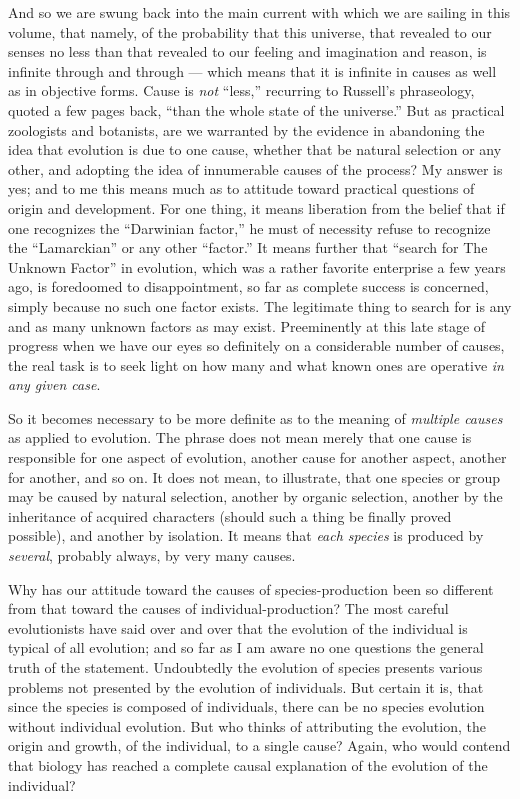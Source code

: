 \documentclass[a4paper, 11pt, oneside, polutonikogreek, english]{article}
\begin{document}
And so we are swung back into the main current with which we are sailing in this volume, that namely, of the probability that this universe, that revealed to our senses no less than that revealed to our feeling and imagination and reason, is infinite through and through --- which means that it is infinite in causes as well as in objective forms. Cause is \emph{not} ``less,'' recurring to Russell's phraseology, quoted a few pages back, ``than the whole state of the universe.'' But as practical zoologists and botanists, are we warranted by the evidence in abandoning the idea that evolution is due to one cause, whether that be natural selection or any other, and adopting the idea of innumerable causes of the process? My answer is yes; and to me this means much as to attitude toward practical questions of origin and development. For one thing, it means liberation from the belief that if one recognizes the ``Darwinian factor,'' he must of necessity refuse to recognize the ``Lamarckian'' or any other ``factor.'' It means further that ``search for The Unknown Factor'' in evolution, which was a rather favorite enterprise a few years ago, is foredoomed to disappointment, so far as complete success is concerned, simply because no such one factor exists. The legitimate thing to search for is any and as many unknown factors as may exist. Preeminently at this late stage of progress when we have our eyes so definitely on a considerable number of causes, the real task is to seek light on how many and what known ones are operative \emph{in any given case}.

So it becomes necessary to be more definite as to the meaning of \emph{multiple causes} as applied to evolution. The phrase does not mean merely that one cause is responsible for one aspect of evolution, another cause for another aspect, another for another, and so on. It does not mean, to illustrate, that one species or group may be caused by natural selection, another by organic selection, another by the inheritance of acquired characters (should such a thing be finally proved possible), and another by isolation. It means that \emph{each species} is produced by \emph{several}, probably always, by very many causes.

Why has our attitude toward the causes of species-production been so different from that toward the causes of individual-production? The most careful evolutionists have said over and over that the evolution of the individual is typical of all evolution; and so far as I am aware no one questions the general truth of the statement. Undoubtedly the evolution of species presents various problems not presented by the evolution of individuals. But certain it is, that since the species is composed of individuals, there can be no species evolution without individual evolution. But who thinks of attributing the evolution, the origin and growth, of the individual, to a single cause? Again, who would contend that biology has reached a complete causal explanation of the evolution of the individual?
\end{document}
